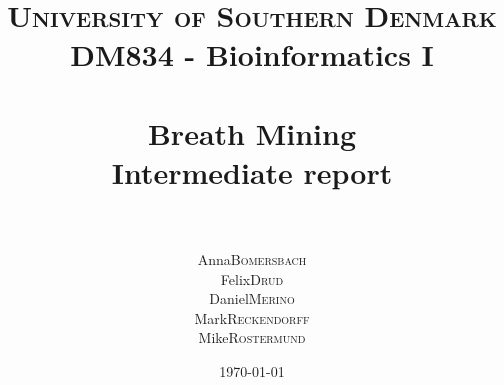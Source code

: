 \documentclass[a4paper,12pt]{article}
\title{	
\normalfont \normalsize 
\textsc{University of Southern Denmark}\\ {DM834 - Bioinformatics I}\\ %
\horrule{0.5pt} \\[0.4cm] %
\LARGE {\textbf{Breath Mining}} \\ %
\large Intermediate report \\ %
\horrule{2pt} \\[0.5cm] %
}
\author{
\begin{tabular}{rl}
Anna &\textsc{Bomersbach}\\
Felix &\textsc{Drud}\\
Daniel &\textsc{Merino}\\
Mark &\textsc{Reckendorff}\\
Mike &\textsc{Rostermund} 
\end{tabular}
}
\date{\normalsize\today} %
\newcommand{\HRule}{\rule{\linewidth}{0.5mm}}
\begin{document}
\maketitle %

\begin{comment}

\begin{document}
\begin{titlepage}
\begin{center}
\texttt{[image: logo.pdf]}\\[1cm]
\textsc{\LARGE University of Southern Denmark}\\[1.5cm]
\textsc{\Large Bioinformatics I}\\[0.5cm]
\HRule \\[0.4cm]
{ \huge \bfseries Breath Mining}\\[0.4cm]
\HRule \\[1.5cm]
\begin{minipage}{0.4\textwidth}
\begin{flushleft} \large
\emph{Author:}\\
Anna \textsc{Bomersbach}\\
Felix \textsc{Drud}\\
Daniel \textsc{Merino}\\
Mark \textsc{Reckendorff}\\
Mike \textsc{Rostermund}
\end{flushleft}
\end{minipage}
\begin{minipage}{0.4\textwidth}
\begin{flushright} \large
\emph{Supervisor:} \\
Associate Professor\\Jan \textsc{Baumbach}\\
\vspace{4mm}
\emph{Teaching Assistants:}\\
Markus \textsc{List}\\
Eudes \textsc{Barbosa}
\end{flushright}
\end{minipage}
\vfill
{\large \today}
\end{center}
\end{titlepage}

\newpage


\end{comment}


\end{document}
